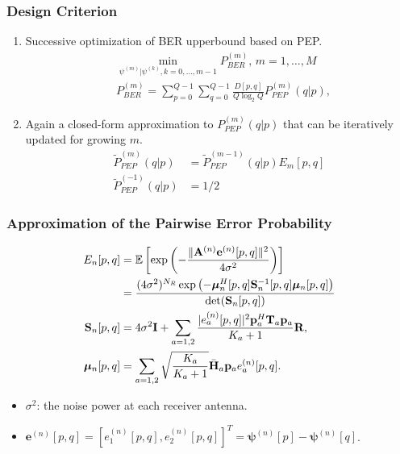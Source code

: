 \documentclass{beamer}
\begin{document}
\begin{frame}
  \frametitle{Design Criterion}
  \begin{enumerate}
    \item<1-> Successive optimization of BER upperbound based on PEP.
    \begin{align*}
      & \min_{\psi^{(m)}|\psi^{(k)},k=0,\ldots,m-1}P_{BER}^{(m)},\,m=1,\ldots,M
      \\ & P_{BER}^{(m)} = \sum_{p=0}^{Q - 1}\sum_{q=0}^{Q - 1}\frac{D[p,
      q]}{Q\log_2Q}P_{PEP}^{(m)}(q|p),
    \end{align*}
    \item<2> Again a closed-form approximation to $P_{PEP}^{(m)}(q|p)$ that can
    be iteratively updated for growing $m$.
    \begin{align*}
      \tilde{P}_{PEP}^{(m)}(q|p) &= \tilde{P}_{PEP}^{(m -
      1)}(q|p)E_m[p,q] \\
      \tilde{P}_{PEP}^{(-1)}(q|p) &= 1 / 2
    \end{align*}
  \end{enumerate}
\end{frame}

\begin{frame}
  \frametitle{Approximation of the Pairwise Error Probability}
  \begin{align*}
    E_n[p,q] &= \mathbb{E}\left[\exp\left(-\frac{\|\mathbf{A}^{(n)}
    \mathbf{e}^{(n)}[p,q]\|^2}{4\sigma^2}\right)\right] \\
    &= \frac{(4\sigma^2)^{N_R}\exp\left(-\bm{\mu}_n^H
    [p,q]\mathbf{S}_n^{-1}[p,q]\bm{\mu}_n[p,q]\right)} {\det(\mathbf{S}_n[p,q])}
    \\
    \mathbf{S}_n[p,q] & =
    4\sigma^2\mathbf{I} +
    \sum_{a=1,2} \frac{|e_a^{(n)}[p,q]|^2 \mathbf{p}_a^H\mathbf{T}_a
    \mathbf{p}_a}{K_a+1} \mathbf{R},\notag\\
    \bm{\mu}_n[p,q] & = \sum_{a=1,2}
    \sqrt{\frac{K_a}{K_a+1}}\bar{\mathbf{H}}_a\mathbf{p}_ae_a^{(n)}[p,q].
  \end{align*}
  \begin{itemize}
    \item $\sigma^2$: the noise power at each receiver antenna.
    \item $\mathbf{e}^{(n)}[p,q] = [e_1^{(n)}[p,q], e_2^{(n)}[p,q]]^T =
    \bm{\psi}^{(n)}[p] - \bm{\psi}^{(n)}[q]$.
  \end{itemize}
\end{frame}
  
\end{document}
